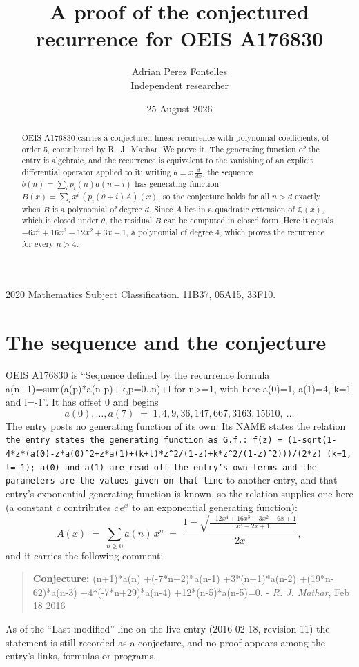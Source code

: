 \documentclass[11pt,a4paper]{article}
\title{A proof of the conjectured recurrence for OEIS A176830}
\author{Adrian Perez Fontelles\\ \small Independent researcher}
\date{25 August 2026}
\theoremstyle{plain}
\theoremstyle{definition}
\begin{document}
\maketitle

\begin{abstract}
OEIS A176830 carries a conjectured linear recurrence with polynomial coefficients, of
order 5, contributed by R.~J.~Mathar. We prove it. The generating function of the
entry is algebraic, and the recurrence is equivalent to the vanishing of an explicit
differential operator applied to it: writing $\theta=x\,\frac{d}{dx}$, the sequence
$b(n)=\sum_{i}p_{i}(n)a(n-i)$ has generating function
$B(x)=\sum_{i}x^{i}\,(p_{i}(\theta+i)A)(x)$, so the conjecture holds for all $n>d$ exactly
when $B$ is a polynomial of degree $d$. Since $A$ lies in a quadratic extension of
$\mathbb{Q}(x)$, which is closed under $\theta$, the residual $B$ can be computed in
closed form. Here it equals $- 6 x^{4} + 16 x^{3} - 12 x^{2} + 3 x + 1$, a polynomial of degree $4$, which proves
the recurrence for every $n>4$.
\end{abstract}

\noindent\small 2020 Mathematics Subject Classification. 11B37, 05A15, 33F10.\normalsize

\section{The sequence and the conjecture}

OEIS A176830 is ``Sequence defined by the recurrence formula a(n+1)=sum(a(p)*a(n-p)+k,p=0..n)+l for n>=1, with here a(0)=1, a(1)=4, k=1 and l=-1''. It has offset $0$ and begins
\[
a(0),\dots,a(7)\;=\;1, 4, 9, 36, 147, 667, 3163, 15610,\ \dots
\]
The entry posts no generating function of its own. Its NAME states the
relation \texttt{the entry states the generating function as G.f.: f(z) = (1-sqrt(1-4*z*(a(0)-z*a(0)\textasciicircum{}2+z*a(1)+(k+l)*z\textasciicircum{}2/(1-z)+k*z\textasciicircum{}2/(1-z)\textasciicircum{}2)))/(2*z) (k=1, l=-1); a(0) and a(1) are read off the entry's own terms and the parameters are the values given on that line} to another entry, and that entry's exponential generating
function is known, so the relation supplies one here (a constant $c$ contributes
$c\,e^{x}$ to an exponential generating function):
\begin{equation}\label{eq:gf}
A(x)\;=\;\sum_{n\ge 0} a(n)\,x^{n}\;=\;\frac{1 - \sqrt{\frac{- 12 x^{4} + 16 x^{3} - 3 x^{2} - 6 x + 1}{x^{2} - 2 x + 1}}}{2 x} ,
\end{equation}
and it carries the following comment:
\begin{quote}\small
\textbf{Conjecture:} (n+1)*a(n) +(-7*n+2)*a(n-1) +3*(n+1)*a(n-2) +(19*n-62)*a(n-3) +4*(-7*n+29)*a(n-4) +12*(n-5)*a(n-5)=0. - \emph{R. J. Mathar}, Feb 18 2016
\end{quote}
As of the ``Last modified'' line on the live entry (2016-02-18, revision 11) the
statement is still recorded as a conjecture, and no proof appears among the entry's links,
formulas or programs.
\end{document}
